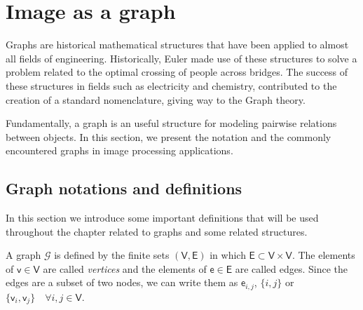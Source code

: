 \section{Image as a graph}

Graphs are historical mathematical structures that have been applied to almost all fields of engineering. Historically, Euler made use of these structures to solve a problem related to the optimal crossing of people across bridges. The success of these structures in fields such as electricity and chemistry, contributed to the creation of a standard nomenclature, giving way to the Graph theory.

Fundamentally, a graph is an useful structure for modeling pairwise relations between objects. In this section, we present the notation and the commonly encountered graphs in image processing applications.





\subsection{Graph notations and definitions}

In this section we introduce some important definitions that will be used throughout the chapter related to graphs and some related structures.

\theoremstyle{definition}
\begin{definition}[Graph]
	A graph $\mathcal{G}$ is defined by the finite sets $(\mathsf{V}, \mathsf{E})$ in which $\mathsf{E} \subset \mathsf{V} \times \mathsf{V}$. The elements of $\mathsf{v} \in \mathsf{V}$ are called \textit{vertices} and the elements of $\mathsf{e} \in \mathsf{E}$ are called edges. Since the edges are a subset of two nodes, we can write them as $\mathsf{e}_{i,j}$, $\{i, j\}$ or $\{\mathsf{v}_{i}, \mathsf{v}_{j}\} \quad \forall i, j \in \mathsf{V}$.
\end{definition}

